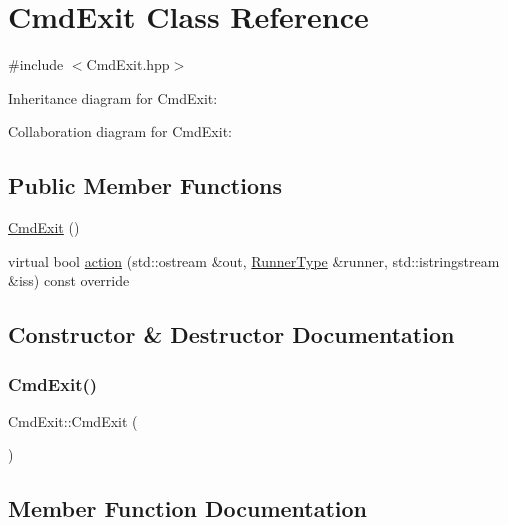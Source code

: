 \hypertarget{classCmdExit}{}\section{Cmd\+Exit Class Reference}
\label{classCmdExit}


{\ttfamily \#include $<$Cmd\+Exit.\+hpp$>$}



Inheritance diagram for Cmd\+Exit\+:


Collaboration diagram for Cmd\+Exit\+:
\subsection*{Public Member Functions}
\begin{DoxyCompactItemize}
\item 
\hyperlink{classCmdExit_ac4d01ff5e1b7de1ad4b54c2313da053c}{Cmd\+Exit} ()
\item 
virtual bool \hyperlink{classCmdExit_a51706475cf423b184855ba45fd7fa1a7}{action} (std\+::ostream \&out, \hyperlink{Command_8hpp_a3594ceaf3c835811a9a67810e7af19f9}{Runner\+Type} \&runner, std\+::istringstream \&iss) const override
\end{DoxyCompactItemize}


\subsection{Constructor \& Destructor Documentation}
\mbox{\label{classCmdExit_ac4d01ff5e1b7de1ad4b54c2313da053c}} 
\subsubsection{\texorpdfstring{Cmd\+Exit()}{CmdExit()}}
{\footnotesize\ttfamily Cmd\+Exit\+::\+Cmd\+Exit (\begin{DoxyParamCaption}{ }\end{DoxyParamCaption})}



\subsection{Member Function Documentation}
\mbox{\label{classCmdExit_a51706475cf423b184855ba45fd7fa1a7}} 
